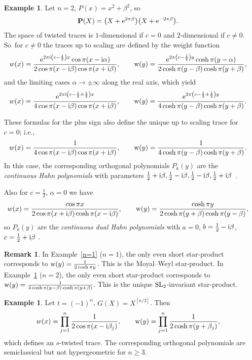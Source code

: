 \documentclass[10pt,a4paper]{amsart}
\theoremstyle{definition}
\newtheorem{Example}[Theorem]{Example}
\newtheorem{Remark}[Theorem]{Remark}
\numberwithin{equation}{section}
\begin{document}
\begin{Example}\label{n=2} Let $n=2$, $P(x)=x^2+\beta^2$, so
\[
\mathbf{P}(X)=\big(X+{\rm e}^{2\pi \beta}\big)\big(X+{\rm e}^{-2\pi \beta}\big).
\]
The space of twisted traces is $1$-dimensional if $c=0$ and $2$-dimensional if $c\ne 0$. So~for $c\ne 0$ the traces up to scaling
are defined by the weight function
\[
w(x)=\frac{{\rm e}^{2\pi {\rm i}\left(c-\frac{1}{2}\right)x} \cos\pi (x-{\rm i}\alpha)}{2\cos \pi(x-{\rm i}\beta )\cos \pi(x+{\rm i}\beta )},\qquad {\rm w}(y)=\frac{{\rm e}^{2\pi\left(c-\frac{1}{2}\right)y} \cosh\pi (y-\alpha)}{2\cosh \pi(y-\beta)\cosh \pi(y+\beta)},
\]
and the limiting cases $\alpha\to \pm \infty$ along the real axis, which yield
\[
w(x)=\frac{{\rm e}^{2\pi {\rm i}\left(c-\frac{1}{2}\pm \frac{1}{2}\right)x}}{4\cos \pi(x-{\rm i}\beta )\cos \pi(x+{\rm i}\beta )},\qquad {\rm w}(y)=\frac{{\rm e}^{2\pi\left(c-\frac{1}{2}\pm \frac{1}{2}\right)y}}{4\cosh \pi(y-\beta)\cosh \pi(y+\beta)}.
\]

These formulas for the plus sign also define the unique up to scaling trace for $c=0$; i.e., \[
w(x)=\frac{1}{4\cos\pi(x-{\rm i}\beta )\cos\pi(x+{\rm i}\beta )},\qquad {\rm w}(y)=\frac{1}{4\cosh\pi(y-\beta)\cosh\pi(y+\beta)}.
\] In this case, the corresponding orthogonal polynomials $P_k(y)$ are the {\it continuous Hahn polynomials} with parameters $\tfrac{1}{2}+{\rm i}\beta ,\tfrac{1}{2}-{\rm i}\beta ,\tfrac{1}{2}-{\rm i}\beta ,\tfrac{1}{2}+{\rm i}\beta$~\cite[Section~1.4]{KS}.

Also for $c=\frac{1}{2}$, $\alpha=0$ we have
\[
w(x)=\frac{\cos \pi x}{2\cos\pi(x+{\rm i}\beta )\cosh\pi(x-{\rm i}\beta )},\qquad {\rm w}(y)=\frac{\cosh \pi y}{2\cosh\pi(y+\beta)\cosh\pi(y-\beta)},
\]
so $P_k(y)$ are the {\it continuous dual Hahn polynomials} with $a=0$, $b=\frac{1}{2}-{\rm i}\beta $, $c=\frac{1}{2}+{\rm i}\beta$ \cite[Section~1.3]{KS}.
\end{Example}

\begin{Remark} In Example~\ref{n=1} ($n=1$),
the only even short star-product corresponds
to ${\rm w}(y)=\frac{1}{2\cosh \pi y}$. This is the Moyal--Weyl star-product.
In Example~\ref{n=2} ($n=2$), the only even short star-product corresponds
to ${\rm w}(y)=\frac{1}{4\cosh \pi (y-\beta)\cosh \pi(y+\beta)}$. This is the
unique ${\rm SL}_2$-invariant star-product.
\end{Remark}

\begin{Example}\label{betai} Let $t=(-1)^n$, $G(X)=X^{[n/2]}$. Then
\[
w(x)=\prod_{j=1}^n\frac{1}{2\cos \pi(x-{\rm i}\beta _j)},\qquad
{\rm w}(y)=\prod_{j=1}^n\frac{1}{2\cosh \pi(y+\beta_j)},
\]
which defines an $s$-twisted trace.
The corresponding orthogonal polynomials are semiclassical but not hypergeometric for $n\ge 3$.
\end{Example}
\end{document}

